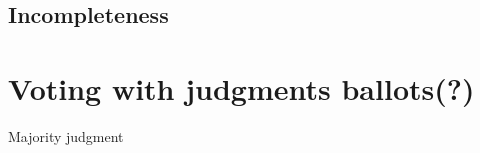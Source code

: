 \subsection{Incompleteness}

\section{Voting with judgments ballots(?)}
\label{sec:judgmentballots}
\begin{genthm}{Majority judgment}
	
\end{genthm}













